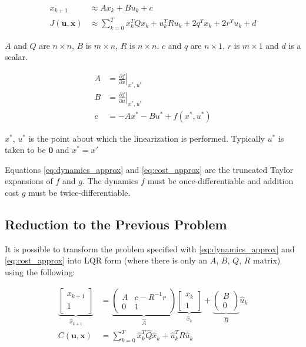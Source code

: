 \documentclass[letterpaper, 10pt, english, conference]{IEEEtran}
\begin{document}
\begin{align}
x_{k+1} & \approx Ax_{k}+Bu_{k}+c\label{eq:dynamics_approx}\\
J\left(\mathbf{u},\mathbf{x}\right) & \approx\sum_{k=0}^{T}x_{k}^{T}Qx_{k}+u_{k}^{T}Ru_{k}+2q^{T}x_{k}+2r^{T}u_{k}+d\label{eq:cost_approx}
\end{align}


$A$ and $Q$ are $n\times n$, $B$ is $m\times n$, $R$ is $n\times n$.
$c$ and $q$ are $n\times1$, $r$ is $m\times1$ and $d$ is a scalar.

\begin{align*}
A & =\left.\frac{\partial f}{\partial x}\right|_{x^{*},u^{*}}\\
B & =\left.\frac{\partial f}{\partial u}\right|_{x^{*},u^{*}}\\
c & =-Ax^{*}-Bu^{*}+f\left(x^{*},u^{*}\right)
\end{align*}


$x^{*}$, $u^{*}$ is the point about which the linearization is performed.
Typically $u^{*}$ is taken to be $\mathbf{0}$ and $x^{*}=x'$

Equations \ref{eq:dynamics_approx} and \ref{eq:cost_approx} are
the truncated Taylor expansions of $f$ and $g$. The dynamics $f$
must be once-differentiable and addition cost $g$ must be twice-differentiable.


\subsection{Reduction to the Previous Problem}

It is possible to transform the problem specified with \ref{eq:dynamics_approx}
and \ref{eq:cost_approx} into LQR form (where there is only an $A$,
$B$, $Q$, $R$ matrix) using the following:

\begin{align*}
\underbrace{\left[\begin{matrix}x_{k+1}\\
1
\end{matrix}\right]}_{\hat{x}_{k+1}} & =\underbrace{\left(\begin{matrix}A & c-R^{-1}r\\
0 & 1
\end{matrix}\right)}_{\hat{A}}\underbrace{\left[\begin{matrix}x_{k}\\
1
\end{matrix}\right]}_{\hat{x}_{k}}+\underbrace{\left(\begin{matrix}B\\
0
\end{matrix}\right)}_{\hat{B}}\hat{u}_{k}\\
C\left(\mathbf{u},\mathbf{x}\right) & =\sum_{k=0}^{T}\hat{x}_{k}^{T}\hat{Q}\hat{x}_{k}+\hat{u}_{k}^{T}R\hat{u}_{k}
\end{align*}
\end{document}
